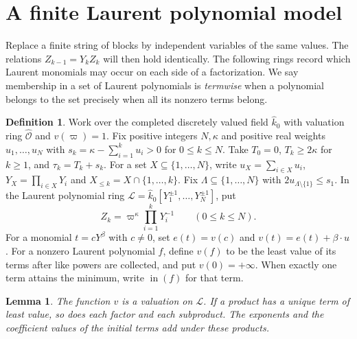 \documentclass[11pt, letterpaper]{article}
\newtheorem{lemma}[theorem]{Lemma}
\theoremstyle{definition}
\newtheorem{definition}[theorem]{Definition}
\theoremstyle{remark}
\begin{document}
\section{A finite Laurent polynomial model}
\label{sec:model}

Replace a finite string of blocks by independent variables of the same values.
The relations $Z_{k - 1} = Y_{k}Z_{k}$ will then hold identically.
The following rings record which Laurent monomials may occur on each side of a factorization.
We say membership in a set of Laurent polynomials is \emph{termwise} when a polynomial belongs to the set precisely when all its nonzero terms belong.

\begin{definition}
    \label{def:GS}
    Work over the completed discretely valued field $\widehat{k}_{0}$ with valuation ring $\widehat{\mathcal{O}}$ and $v(\varpi) = 1$.
    Fix positive integers $N, \kappa$ and positive real weights $u_{1}, \ldots, u_{N}$ with $s_{k} = \kappa - \sum_{i = 1}^{k} u_{i} > 0$ for $0 \le k \le N$.
    Take $T_{0} = 0$, $T_{k} \ge 2\kappa$ for $k \ge 1$, and $\tau_{k} = T_{k} + s_{k}$.
    For a set $X \subseteq \{1, \ldots, N\}$, write $u_{X} = \sum_{i \in X} u_{i}$, $Y_{X} = \prod_{i \in X} Y_{i}$ and $X_{\le k} = X \cap \{1, \ldots, k\}$.
    Fix $\Lambda \subseteq \{1, \ldots, N\}$ with $2u_{\Lambda \setminus \{1\}} \le s_{1}$.
    In the Laurent polynomial ring $\mathcal{L} = \widehat{k}_{0}[Y_{1}^{\pm 1}, \ldots, Y_{N}^{\pm 1}]$, put
    \[
        Z_{k} = \varpi^{\kappa}\prod_{i = 1}^{k}Y_{i}^{-1}
        \qquad (0 \le k \le N).
    \]
    For a monomial $t = cY^{\beta}$ with $c \ne 0$, set $e(t) = v(c)$ and $v(t) = e(t) + \beta \cdot u$.
    For a nonzero Laurent polynomial $f$, define $v(f)$ to be the least value of its terms after like powers are collected, and put $v(0) = +\infty$.
    When exactly one term attains the minimum, write $\operatorname{in}(f)$ for that term.
\end{definition}

\begin{lemma}
    \label{lem:V}
    The function $v$ is a valuation on $\mathcal{L}$.
    If a product has a unique term of least value, so does each factor and each subproduct.
    The exponents and the coefficient values of the initial terms add under these products.
\end{lemma}
\end{document}

